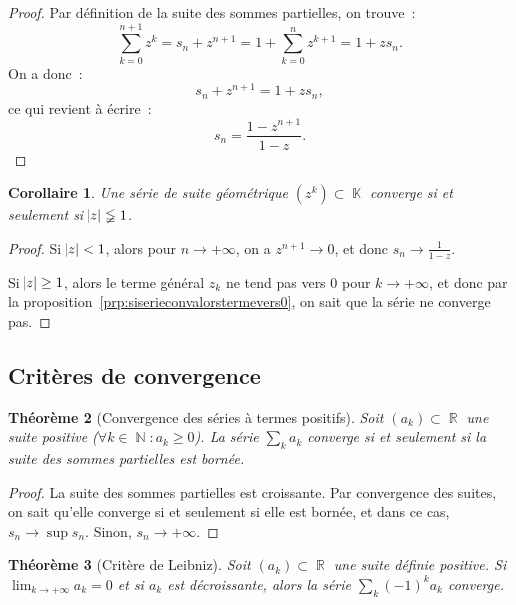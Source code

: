 \documentclass{article}
\DeclareMathOperator{\K}{\mathbb K}
\DeclareMathOperator{\N}{\mathbb N}
\DeclareMathOperator{\R}{\mathbb R}
\newcommand{\geomsum}[2]{\frac {1 - #1^{#2+1}}{1 - #1}}
\newtheorem{thm}{Théorème}[section]
\newtheorem{cor}[thm]{Corollaire}
\theoremstyle{definition}
\theoremstyle{remark}
\begin{document}
		\begin{proof} Par définition de la suite des sommes partielles, on trouve~:
		\[\sum_{k=0}^{n+1}z^k = s_n + z^{n+1} = 1 + \sum_{k=0}^nz^{k+1} = 1 + zs_n.\]
		On a donc~:
		\[s_n + z^{n+1} = 1 + zs_n,\]
		ce qui revient à écrire~:
		\[s_n = \geomsum zn.\]
		\end{proof}

		\begin{cor} Une série de suite géométrique $(z^k) \subset \K$ converge si et seulement si $\abs z \lneqq 1$. \end{cor}

		\begin{proof} Si $\abs z < 1$, alors pour $n \to +\infty$, on a $z^{n+1} \to 0$, et donc $s_n \to \frac 1{1-z}$.

		Si $\abs z \geq 1$, alors le terme général $z_k$ ne tend pas vers 0 pour $k \to +\infty$, et donc par la
		proposition~\ref{prp:siserieconvalorstermevers0}, on sait que la série ne converge pas.
		\end{proof}

	\subsection{Critères de convergence}
		\begin{thm}[Convergence des séries à termes positifs] Soit $(a_k) \subset \R$ une suite positive ($\forall k \in \N : a_k \geq 0$).
		La série $\sum_k a_k$ converge si et seulement si la suite des sommes partielles est bornée.
		\end{thm}

		\begin{proof} La suite des sommes partielles est croissante. Par convergence des suites, on sait qu'elle converge si et seulement si elle est bornée, et
		dans ce cas, $s_n \to \sup s_n$. Sinon, $s_n \to +\infty$.
		\end{proof}

		\begin{thm}[Critère de Leibniz] Soit $(a_k) \subset \R$ une suite définie positive. Si $\lim_{k \to +\infty}a_k = 0$ et si $a_k$ est décroissante, alors
		la série $\sum_k(-1)^ka_k$ converge.
		\end{thm}
\end{document}
